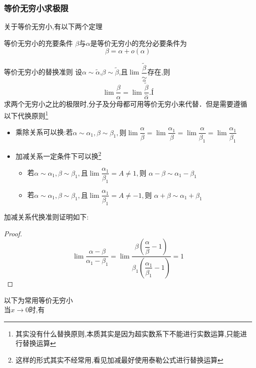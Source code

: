 \documentclass[10pt, a4paper, oneside, UTF8]{ctexbook}
\begin{document}
\begin{sloppypar}
    \subsubsection{等价无穷小求极限}
    关于等价无穷小,有以下两个定理
    \begin{defn}{等价无穷小的充要条件}{}
        $\beta$与$\alpha$是等价无穷小的充分必要条件为
        $$
            \beta=\alpha + o(\alpha)
        $$
    \end{defn}
    \begin{defn}{等价无穷小的替换准则}{}
        设$\alpha\sim\widetilde{\alpha}$,$\beta\sim\widetilde{\beta}$,且$\lim\dfrac{\widetilde{\beta}}{\underset{\alpha}{\operatorname*{\sim}}}$存在,则
        $$
            \lim\dfrac{\beta}{\alpha}=\lim\dfrac{\widetilde{\beta}}{\overset{\sim}{\alpha}}.Í
        $$
        求两个无穷小之比的极限时,分子及分母都可用等价无穷小来代替．但是需要遵循以下代换原则\footnote{其实没有什么替换原则,本质其实是因为超实数系下不能进行实数运算,只能进行替换运算}
        \begin{itemize}
            \item 乘除关系可以换:若$\alpha\sim\alpha_1,\beta\sim\beta_1,\text{则}\lim\dfrac\alpha\beta=\lim\dfrac{\alpha_1}\beta=\lim\dfrac\alpha{\beta_1}=\lim\dfrac{\alpha_1}{\beta_1}$
            \item 加减关系一定条件下可以换\footnote{这样的形式其实不经常用,看见加减最好使用泰勒公式进行替换运算}
                  \begin{itemize}
                      \item 若$\alpha\sim\alpha_{1},\beta\sim\beta_{1},\text{且}\operatorname*{lim}\dfrac{\alpha_{1}}{\beta_{1}}=A\neq1,\text{则 }\alpha-\beta\sim\alpha_{1}-\beta_{1}$
                      \item 若$\alpha\sim\alpha_{1},\beta\sim\beta_{1},\text{且}\operatorname*{lim}\dfrac{\alpha_{1}}{\beta_{1}}=A\neq-1,\text{则 }\alpha+\beta\sim\alpha_{1}+\beta_{1}$
                  \end{itemize}
        \end{itemize}
        加减关系代换准则证明如下:
        \begin{proof}
            $$\lim \dfrac{\alpha-\beta}{\alpha_1 -\beta_1}=\lim \dfrac{\beta (\dfrac{\alpha}{\beta}-1)}{\beta_1(\dfrac{\alpha_1}{\beta_1}-1)}=1$$
        \end{proof}
    \end{defn}
    以下为常用等价无穷小
    \\当$x \to 0$时,有
    \begin{enumerate}

\end{enumerate}
\end{sloppypar}
\end{document}
